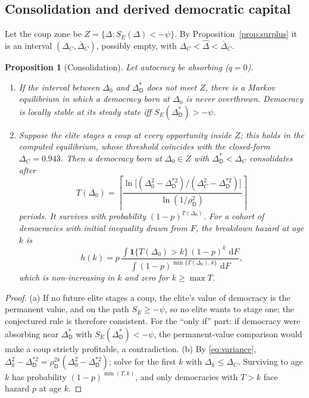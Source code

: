 \documentclass[11pt]{article}
\newtheorem{proposition}{Proposition}
\theoremstyle{remark}
\newcommand{\D}{\mathsf{D}}
\newcommand{\dd}{\,\mathrm{d}}
\begin{document}
\subsection{Consolidation and derived democratic capital}\label{sec:democap}

Let the coup zone be $Z=\{\Delta: S_E(\Delta)<-\psi\}$.  By Proposition~\ref{prop:surplus} it is an interval $(\Delta_C,\bar\Delta_C)$, possibly empty, with $\Delta_C<\hat\Delta<\bar\Delta_C$.

\begin{proposition}[Consolidation]\label{prop:consol}
Let autocracy be absorbing ($q=0$).
\begin{enumerate}[label=(\alph*)]
\item If the interval between $\Delta_0$ and $\Delta^*_\D$ does not meet $Z$, there is a Markov equilibrium in which a democracy born at $\Delta_0$ is never overthrown.  Democracy is locally stable at its steady state iff $S_E(\Delta^*_\D)>-\psi$.
\item Suppose the elite stages a coup at every opportunity inside $Z$; this holds in the computed equilibrium, whose threshold coincides with the closed-form $\Delta_C=0.943$.  Then a democracy born at $\Delta_0\in Z$ with $\Delta^*_\D<\Delta_C$ consolidates after
\begin{equation}
T(\Delta_0)=\left\lceil\frac{\ln\big[(\Delta_0^2-\Delta^{*2}_\D)/(\Delta_C^2-\Delta^{*2}_\D)\big]}{\ln(1/\rho_\D^2)}\right\rceil
\label{eq:T}
\end{equation}
periods.  It survives with probability $(1-p)^{T(\Delta_0)}$.  For a cohort of democracies with initial inequality drawn from $F$, the breakdown hazard at age $k$ is
\begin{equation}
h(k)=p\,\frac{\int \mathbf 1\{T(\Delta_0)>k\}\,(1-p)^k\,\dd F}{\int (1-p)^{\min\{T(\Delta_0),k\}}\,\dd F},
\label{eq:hazard}
\end{equation}
which is non-increasing in $k$ and zero for $k\ge\max T$.
\end{enumerate}
\end{proposition}
\begin{proof}
(a) If no future elite stages a coup, the elite's value of democracy is the permanent value, and on the path $S_E\ge-\psi$, so no elite wants to stage one; the conjectured rule is therefore consistent.  For the ``only if'' part: if democracy were absorbing near $\Delta^*_\D$ with $S_E(\Delta^*_\D)<-\psi$, the permanent-value comparison would make a coup strictly profitable, a contradiction.  (b) By \eqref{eq:variance}, $\Delta^2_k-\Delta^{*2}_\D=\rho_\D^{2k}(\Delta_0^2-\Delta^{*2}_\D)$; solve for the first $k$ with $\Delta_k\le\Delta_C$.  Surviving to age $k$ has probability $(1-p)^{\min(T,k)}$, and only democracies with $T>k$ face hazard $p$ at age $k$.
\end{proof}
\end{document}
